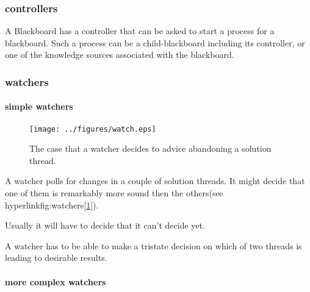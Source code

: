 \documentclass[]{lofar}
\begin{document}
      \subsubsection{controllers}
      \label{subsubsec:controllers}\hypertarget{subsubsec:controllers}{}

        A Blackboard has a controller that can be asked to start a
        process for a blackboard. Such a process can be a
        child-blackboard including its controller, or one of the
        knowledge sources associated with the blackboard.

      \subsubsection{watchers}
      \label{subsubsec:watchers}\hypertarget{subsubsec:watchers}{}

        \paragraph{simple watchers}
        \label{par:simple-watchers}\hypertarget{par:simple-watchers}{}
          \begin{figure}
            \texttt{[image: ../figures/watch.eps]}
            \hypertarget{fig:watchers}{}
            \caption{The case that a watcher decides to advice
            abandoning a solution thread.\label{fig:watchers}}
          \end{figure}

          A watcher polls for changes in a couple of solution
          threads. It might decide that one of them is remarkably more
          sound then the others(see
          hyperlink{fig:watchers}{[\ref{fig:watchers}]}).

          Usually it will have to decide that it can't decide yet.

          \begin{requirement}
            A watcher has to be able to make a tristate decision on
            which of two threads is leading to desirable results.
            \caption{tristate decisions\label{req:no-decision}}
          \end{requirement}

        \paragraph{more complex watchers}
        \label{par:complex-watchers}\hypertarget{par:complex-watchers}{}
\end{document}
